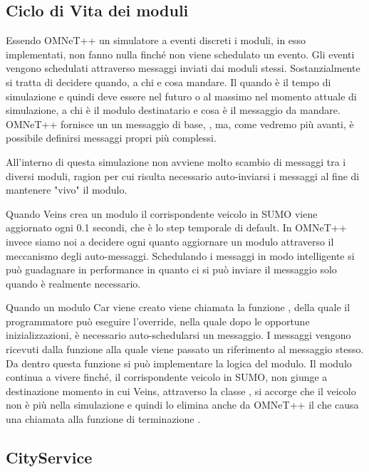 \subsection{Ciclo di Vita dei moduli}\label{subsec:lifecycle}

Essendo OMNeT++ un simulatore a eventi discreti i moduli, in esso implementati, non fanno nulla finché non viene schedulato un evento. Gli eventi vengono schedulati attraverso messaggi inviati dai moduli stessi. Sostanzialmente si tratta di decidere quando, a chi e cosa mandare.
Il quando è il tempo di simulazione e quindi deve essere nel futuro o al massimo nel momento attuale di simulazione, a chi è il modulo destinatario e cosa è il messaggio da mandare. OMNeT++ fornisce un un messaggio di base, , ma, come vedremo più avanti, è possibile definirsi messaggi propri più complessi.

All'interno di questa simulazione non avviene molto scambio di messaggi tra i diversi moduli, ragion per cui risulta necessario auto-inviarsi i messaggi al fine di mantenere "vivo" il modulo.

Quando Veins crea un modulo il corrispondente veicolo in SUMO viene aggiornato ogni 0.1 secondi, che è lo step temporale di default. In OMNeT++ invece siamo noi a decidere ogni quanto aggiornare un modulo attraverso il meccanismo degli auto-messaggi. Schedulando i messaggi in modo intelligente si può guadagnare in performance in quanto ci si può inviare il messaggio solo quando è realmente necessario.

Quando un modulo Car viene creato viene chiamata la funzione , della quale il programmatore può eseguire l'override, nella quale dopo le opportune inizializzazioni, è necessario auto-schedularsi un messaggio. I messaggi vengono ricevuti dalla funzione  alla quale viene passato un riferimento al messaggio stesso. Da dentro questa funzione si può implementare la logica del modulo. Il modulo continua a vivere finché, il corrispondente veicolo in SUMO, non giunge a destinazione momento in cui Veins, attraverso la classe , si accorge che il veicolo non è più nella simulazione e quindi lo elimina anche da OMNeT++ il che causa una chiamata alla funzione di terminazione .

\subsection{CityService}\label{sec:module-city}

